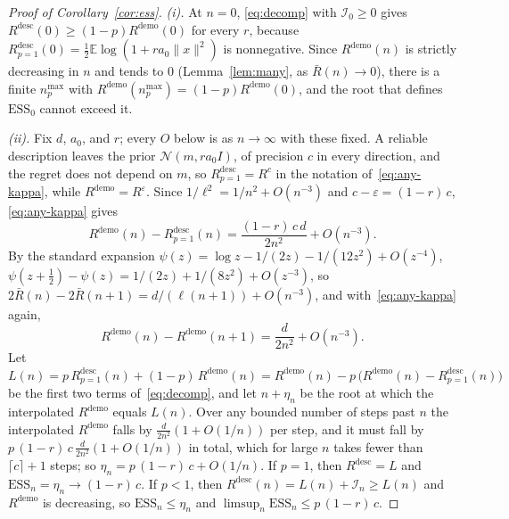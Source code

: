\documentclass{article}
\newcommand{\ess}{\mathrm{ESS}}
\newcommand{\E}{\mathbb{E}}
\begin{document}
\begin{proof}[Proof of Corollary~\ref{cor:ess}]
\emph{(i).} At $n = 0$, \eqref{eq:decomp} with $\mathcal{I}_0 \ge 0$ gives $R^{\mathrm{desc}}(0) \ge (1-p)R^{\mathrm{demo}}(0)$ for every $r$, because $R^{\mathrm{desc}}_{p=1}(0) = \tfrac12 \E \log(1 + r a_0 \|x\|^2)$ is nonnegative. Since $R^{\mathrm{demo}}(n)$ is strictly decreasing in $n$ and tends to $0$ (Lemma~\ref{lem:many}, as $\bar R(n) \to 0$), there is a finite $n^{\max}_p$ with $R^{\mathrm{demo}}(n^{\max}_p) = (1-p)R^{\mathrm{demo}}(0)$, and the root that defines $\ess_0$ cannot exceed it.

\emph{(ii).} Fix $d$, $a_0$, and $r$; every $O$ below is as $n \to \infty$ with these fixed. A reliable description leaves the prior $\mathcal{N}(m, r a_0 I)$, of precision $c$ in every direction, and the regret does not depend on $m$, so $R^{\mathrm{desc}}_{p=1} = R^{c}$ in the notation of~\eqref{eq:any-kappa}, while $R^{\mathrm{demo}} = R^{\varepsilon}$. Since $1/\ell^2 = 1/n^2 + O(n^{-3})$ and $c - \varepsilon = (1-r)\,c$, \eqref{eq:any-kappa} gives
\[
R^{\mathrm{demo}}(n) - R^{\mathrm{desc}}_{p=1}(n) = \frac{(1-r)\,c\,d}{2n^2} + O(n^{-3}).
\]
By the standard expansion $\psi(z) = \log z - 1/(2z) - 1/(12z^2) + O(z^{-4})$, $\psi(z + \tfrac12) - \psi(z) = 1/(2z) + 1/(8z^2) + O(z^{-3})$, so $2\bar R(n) - 2\bar R(n+1) = d/(\ell(n+1)) + O(n^{-3})$, and with~\eqref{eq:any-kappa} again,
\[
R^{\mathrm{demo}}(n) - R^{\mathrm{demo}}(n+1) = \frac{d}{2n^2} + O(n^{-3}).
\]
Let $L(n) = p\,R^{\mathrm{desc}}_{p=1}(n) + (1-p)\,R^{\mathrm{demo}}(n) = R^{\mathrm{demo}}(n) - p\,\big(R^{\mathrm{demo}}(n) - R^{\mathrm{desc}}_{p=1}(n)\big)$ be the first two terms of~\eqref{eq:decomp}, and let $n + \eta_n$ be the root at which the interpolated $R^{\mathrm{demo}}$ equals $L(n)$. Over any bounded number of steps past $n$ the interpolated $R^{\mathrm{demo}}$ falls by $\tfrac{d}{2n^2}(1 + O(1/n))$ per step, and it must fall by $p\,(1-r)\,c\,\tfrac{d}{2n^2}(1 + O(1/n))$ in total, which for large $n$ takes fewer than $\lceil c \rceil + 1$ steps; so $\eta_n = p\,(1-r)\,c + O(1/n)$. If $p = 1$, then $R^{\mathrm{desc}} = L$ and $\ess_n = \eta_n \to (1-r)\,c$. If $p < 1$, then $R^{\mathrm{desc}}(n) = L(n) + \mathcal{I}_n \ge L(n)$ and $R^{\mathrm{demo}}$ is decreasing, so $\ess_n \le \eta_n$ and $\limsup_n \ess_n \le p\,(1-r)\,c$.
\end{proof}
\end{document}
